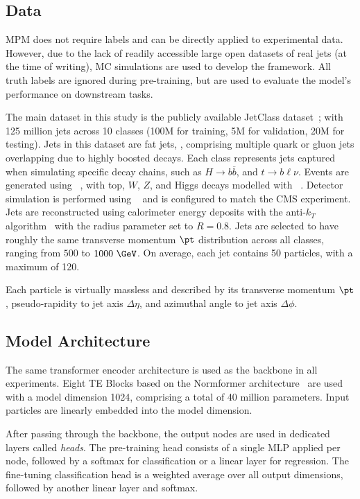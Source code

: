 \subsection{Data}
\label{sec:mpm_data}

MPM does not require labels and can be directly applied to experimental data.
However, due to the lack of readily accessible large open datasets of real jets (at the time of writing), MC simulations are used to develop the framework.
All truth labels are ignored during pre-training, but are used to evaluate the model's performance on downstream tasks.

The main dataset in this study is the publicly available JetClass dataset~\cite{JetClass}; with 125 million jets across 10 classes (100M for training, 5M for validation, 20M for testing).
Jets in this dataset are fat jets, , comprising multiple quark or gluon jets overlapping due to highly boosted decays.
Each class represents jets captured when simulating specific decay chains, such as $H \rightarrow b\overline{b}$, and $t \rightarrow b \ell \nu$.
Events are generated using \pythia~\cite{Pythia8}, with top, $W$, $Z$, and Higgs decays modelled with \madgraph~\cite{MadGraph}.
Detector simulation is performed using \delphes~\cite{Delphes} and is configured to match the CMS experiment.
Jets are reconstructed using calorimeter energy deposits with the anti-$k_T$ algorithm~\cite{AntiKt} with the radius parameter set to $R=0.8$.
Jets are selected to have roughly the same transverse momentum $\pt$ distribution across all classes, ranging from $500$ to $1000~\GeV$.
On average, each jet contains 50 particles, with a maximum of 120.

Each particle is virtually massless and described by its transverse momentum $\pt$, pseudo-rapidity to jet axis $\Delta\eta$, and azimuthal angle to jet axis $\Delta\phi$.

\subsection{Model Architecture}

The same transformer encoder architecture is used as the backbone in all experiments.
Eight TE Blocks based on the Normformer architecture~\cite{Normformer} are used with a model dimension 1024, comprising a total of 40 million parameters.
Input particles are linearly embedded into the model dimension.

After passing through the backbone, the output nodes are used in dedicated layers called \textit{heads}.
The pre-training head consists of a single MLP applied per node, followed by a softmax for classification or a linear layer for regression.
The fine-tuning classification head is a weighted average over all output dimensions, followed by another linear layer and softmax.

